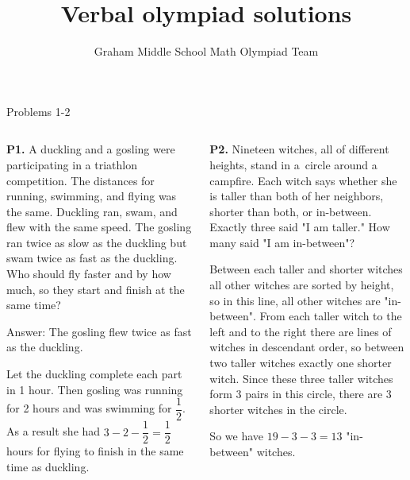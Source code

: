 \documentclass[9pt,aspectratio=169,handout]{beamer}
\title{Verbal olympiad solutions}
\subtitle[Graham Middle School]{Graham Middle School Math Olympiad Team}
\begin{document}
\maketitle

\begin{frame}{Problems 1-2}
  \begin{columns}[T]
    \begin{column}{0.5\textwidth}
      \begin{problem}
        \textbf{P1.} A duckling and a gosling were participating in a triathlon competition. The
        distances for running, swimming, and flying was the same. Duckling ran, swam, and flew with the same speed. The gosling ran twice as slow as the duckling
        but swam twice as fast as the duckling. Who should fly faster and by how much, so they start and finish at the same time?
      \end{problem}\pause

      Answer: The gosling flew twice as fast as the duckling.

      Let the duckling complete each part in 1 hour. Then gosling was running for 2 hours and was swimming for $\dfrac{1}{2}$. As a result she had $3 - 2 - \dfrac{1}{2} = \dfrac{1}{2}$ hours for flying to finish in the same time as duckling. \pause
    \end{column}
    \begin{column}{0.5\textwidth}
      \begin{problem}
        \textbf{P2.} Nineteen witches, all of different heights, stand in a~circle around a campfire.
        Each witch says whether she is taller than both of her neighbors, shorter than both,
        or in-between. Exactly three said "I am taller." How many said "I am in-between"?
      \end{problem}\pause
      Between each taller and shorter witches all other witches are sorted by height, so in this line, all other witches are "in-between". From each taller witch to the left and to the right there are lines of witches in descendant order, so between two taller witches exactly one shorter witch. Since these three taller witches form $3$ pairs in this circle, there are $3$ shorter witches in the circle. 
      
      So we have $19 - 3 - 3 = 13$ "in-between" witches. 
    \end{column}
  \end{columns}
\end{frame}
\end{document}
